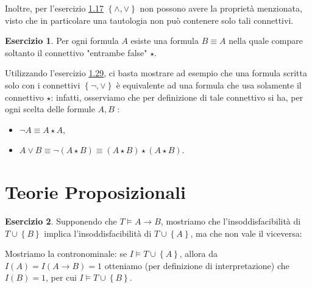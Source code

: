 \documentclass[a4paper]{article}
\newcommand{\limplies}{\rightarrow}
\theoremstyle{definition}
\theoremstyle{definition}
\theoremstyle{remark}
\theoremstyle{definition}
\newtheorem{exercise}{Esercizio}[section]
\begin{document}
Inoltre, per l'esercizio \hyperref[connettivi]{1.17} $\left\{ \land,\lor \right\} $ non possono avere la proprietà menzionata, visto che in particolare una tautologia non può contenere solo tali connettivi.
\setcounter{exercise}{30}
\begin{exercise}
	Per ogni formula $A$ esiste una formula $B\equiv A$ nella quale compare soltanto il connettivo "entrambe false" $\star$.
\end{exercise}
Utilizzando l'esercizio \hyperref[equivalenze]{1.29}, ci basta mostrare ad esempio che una formula scritta solo con i connettivi $\left\{ \lnot,\lor \right\}$ è equivalente ad una formula che usa solamente il connettivo $\star$: infatti, osserviamo che per
definizione di tale connettivo si ha, per ogni scelta delle formule $A,B$ :
\begin{itemize}
	\item $\lnot A\equiv A\star A$,
	\item $A\lor B\equiv\lnot\left( A\star B \right) \equiv \left( A\star B \right) \star\left( A\star B \right) $.
\end{itemize}
\section{Teorie Proposizionali}
\setcounter{exercise}{9}
\begin{exercise}
Supponendo che $T\models A\limplies B$, mostriamo che l'insoddisfacibilità di $T\cup\left\{ B \right\} $ implica l'insoddisfacibilità di $T\cup\left\{ A \right\} $, ma che non
vale il viceversa:
\end{exercise}
Mostriamo la contronominale: se $I\models T \cup\left\{A\right\}$, allora da $I(A)=I(A\limplies B)=1$ otteniamo (per definizione di interpretazione) che $I(B)=1$, per cui $I\models T\cup \left\{ B \right\} $.
\end{document}
